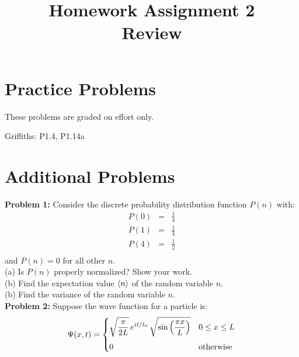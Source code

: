 \documentclass[12pt]{article}
\begin{document}

\date{\vspace{-5ex}}

\title{Homework Assignment 2 \\ Review}

\maketitle

\section*{Practice Problems}

These problems are graded on effort only.

Griffiths: P1.4, P1.14a

\section*{Additional Problems}

\noindent
    {\bf Problem 1:} Consider the discrete probability distribution function $P(n)$ with:
\begin{eqnarray*}
  P(0) &=& \frac{1}{4}\\[8pt]
  P(1) &=& \frac{1}{4}\\[8pt]
  P(4) &=& \frac{1}{2}\\
\end{eqnarray*}
and $P(n) = 0$ for all other $n$.\\[5pt]
(a) Is $P(n)$ properly normalized?  Show your work.\\[5pt]
(b) Find the expectation value $\braket{n}$ of the random variable $n$.\\[5pt]
(b) Find the variance of the random variable $n$.\\ 

\vskip 1cm
\noindent
{\bf Problem 2:} Suppose the wave function for a particle is:
\begin{displaymath}
  \Psi(x,t) =
  \begin{cases}    
    {\displaystyle \sqrt{\frac{\pi}{2L}}\, e^{it/t_0} \, \sqrt{\sin\left(\frac{\pi x}{L}\right)}} & {\displaystyle 0 \leq x \leq L} \\[10pt]
    {\displaystyle 0} & {\displaystyle {\rm otherwise}} \\
  \end{cases}
\end{displaymath}
\end{document}
